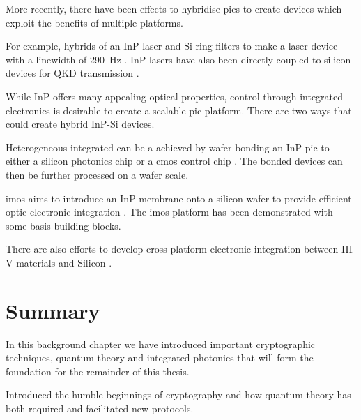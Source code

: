 More recently, there have been effects to hybridise \acp{pic} to create devices which exploit the benefits of multiple platforms. 

For example, hybrids of an \ac{InP} laser and Si ring filters to make a laser device with a linewidth of \SI{290}{Hz} \cite{Fan2017}. \ac{InP} lasers have also been directly coupled to silicon devices for \ac{QKD} transmission \cite{Agnesi2019}.

While \ac{InP} offers many appealing optical properties, control through integrated electronics is desirable to create a scalable \ac{pic} platform. There are two ways that could create hybrid \ac{InP}-Si devices. 

Heterogeneous integrated can be a achieved by wafer bonding an \ac{InP} \ac{pic} to either a silicon photonics chip or a \ac{cmos} control chip \cite{jeppix}. The bonded devices can then be further processed on a wafer scale.

\Ac{imos} aims to introduce an \ac{InP} membrane onto a silicon wafer to provide efficient optic-electronic integration \cite{jeppix, IMOS}. The \ac{imos} platform has been demonstrated with some basis building blocks.

There are also efforts to develop cross-platform electronic integration between III-V materials and Silicon \cite{}. 

\section{Summary}

In this background chapter we have introduced important cryptographic techniques, quantum theory and integrated photonics that will form the foundation for the remainder of this thesis.

Introduced the humble beginnings of cryptography and how quantum theory has both required and facilitated new protocols.

